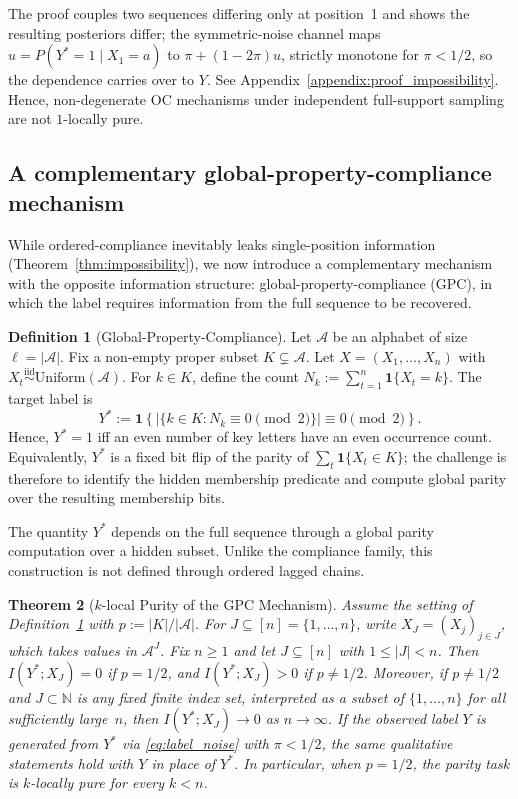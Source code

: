\documentclass{article} %
\theoremstyle{plain}
\newtheorem{theorem}{Theorem}[section]
\theoremstyle{definition}
\newtheorem{definition}[theorem]{Definition}
\theoremstyle{remark}
\begin{document}
The proof couples two sequences differing only at position~1 and shows the resulting posteriors differ; the symmetric-noise channel maps \(u=P(Y^*=1\mid X_1=a)\) to \(\pi+(1-2\pi)u\), strictly monotone for \(\pi<1/2\), so the dependence carries over to \(Y\). See Appendix~\ref{appendix:proof_impossibility}. Hence, non-degenerate OC mechanisms under independent full-support sampling are not $1$-locally pure.

\subsection{A complementary global-property-compliance mechanism}
\label{sec:parity}
While ordered-compliance inevitably leaks single-position information (Theorem~\ref{thm:impossibility}), we now introduce a complementary mechanism with the opposite information structure: global-property-compliance (GPC), in which the label requires information from the full sequence to be recovered.

\begin{definition}[Global-Property-Compliance]
\label{def:parity}
Let $\mathcal{A}$ be an alphabet of size $\ell = |\mathcal{A}|$. Fix a non-empty proper subset $K \subsetneq \mathcal{A}$.
Let $X = (X_1,\ldots,X_n)$ with $X_t \overset{\mathrm{iid}}{\sim} \mathrm{Uniform}(\mathcal{A})$.
For $k \in K$, define the count $N_k := \sum_{t=1}^n \mathbf{1}\{X_t = k\}$.
The target label is
\[
Y^* := \mathbf{1}\!\left\{
\left|\{k\in K : N_k \equiv 0 \pmod 2\}\right|
\equiv 0 \pmod 2
\right\}.
\]
Hence, $Y^* = 1$ iff an even number of key letters have an even occurrence count. Equivalently, \(Y^*\) is a fixed bit flip of the parity of $\sum_t \mathbf{1}\{X_t\in K\}$; the challenge is therefore to identify the hidden membership predicate and compute global parity over the resulting membership bits.
\end{definition}

The quantity $Y^*$ depends on the full sequence through a global parity computation over a hidden subset. Unlike the compliance family, this construction is not defined through ordered lagged chains.

\begin{theorem}[$k$-local Purity of the GPC Mechanism]
\label{thm:parity_local_purity}
Assume the setting of Definition~\ref{def:parity} with
$p := |K|/|\mathcal{A}|$. For \(J\subseteq [n] = \{1, \ldots, n\}\), write
\(X_J=(X_j)_{j\in J}\), which takes values in \(\mathcal A^J\).
Fix $n\ge 1$ and let
$J \subseteq [n]$ with $1 \le |J| < n$. Then $I(Y^*;X_J)=0$ if $p = 1/2$, and $I(Y^*;X_J)>0$ if $p \neq 1/2$. Moreover, if $p\neq 1/2$ and $J\subset \mathbb{N}$ is any fixed finite index set, interpreted as a subset of $\{1,\ldots,n\}$ for all sufficiently large~$n$, then $I(Y^*;X_J)\to 0$ as
$n\to\infty$. If the observed label $Y$ is generated from $Y^*$ via
\eqref{eq:label_noise} with $\pi<1/2$, the same qualitative statements hold with $Y$ in place of $Y^*$. In particular, when $p=1/2$, the parity task is $k$-locally pure for every $k<n$.
\end{theorem}
\end{document}
